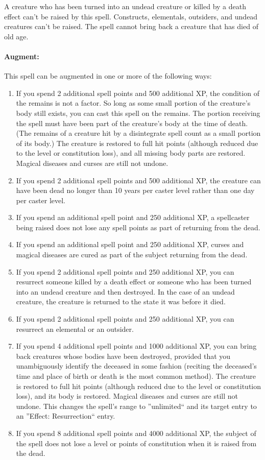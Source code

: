 A creature who has been turned into an undead creature or killed by a death effect can't be raised by this spell. 
Constructs, elementals, outsiders, and undead creatures can't be raised. 
The spell cannot bring back a creature that has died of old age.

\paragraph{Augment:} This spell can be augmented in one or more of the following ways:
\begin{enumerate}
 \item If you spend 2 additional spell points and 500 additional XP, the condition of the remains is not a factor. 
So long as some small portion of the creature's body still exists, you can cast this spell on the remains. 
The portion receiving the spell must have been part of the creature's body at the time of death. 
(The remains of a creature hit by a disintegrate spell count as a small portion of its body.)
The creature is restored to full hit points (although reduced due to the level or constitution loss),
and all missing body parts are restored. Magical diseases and curses are still not undone.
 \item If you spend 2 additional spell points and 500 additional XP, 
the creature can have been dead no longer than 10 years per caster level rather than one day per caster level.
 \item If you spend an additional spell point and 250 additional XP, a spellcaster being raised does not
lose any spell points as part of returning from the dead.
 \item If you spend an additional spell point and 250 additional XP, 
curses and magical diseases are cured as part of the subject returning from the dead.
 \item If you spend 2 additional spell points and 250 additional XP, 
you can resurrect someone killed by a death effect or someone who has been turned into an undead creature and then destroyed.
In the case of an undead creature, the creature is returned to the state it was before it died.
 \item If you spend 2 additional spell points and 250 additional XP,
you can resurrect an elemental or an outsider.
 \item If you spend 4 additional spell points and 1000 additional XP, 
you can bring back creatures whose bodies have been destroyed, 
provided that you unambiguously identify the deceased in some fashion 
(reciting the deceased's time and place of birth or death is the most common method).
The creature is restored to full hit points (although reduced due to the level or constitution loss),
and its body is restored. Magical diseases and curses are still not undone.
This changes the spell's range to ''unlimited`` and its target entry to an ''Effect: Resurrection`` entry.
 \item If you spend 8 additional spell points and 4000 additional XP,
the subject of the spell does not lose a level or points of constitution when it is raised from the dead.
\end{enumerate}

